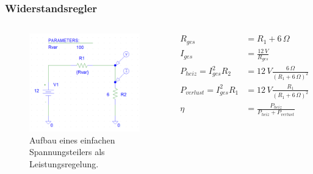 \documentclass{beamer}
\begin{document}
	\begin{frame}
		\frametitle{Widerstandsregler}
		\begin{columns}
			\begin{figure}[tbh]
				\centering
				\includegraphics[width=1\linewidth]{medien/V1-0.png}
				\caption[Erster Aufbau]{Aufbau eines einfachen Spannungsteilers als Leistungsregelung.}
			\end{figure}
			\begin{align*}
				R_{ges}&=R_1+6\,\Omega \\
				I_{ges}&=\frac{12\, V}{R_{ges}} \\
				P_{heiz}=I_{ges}^2R_2&=12\, V\frac{6\,\Omega}{\left( R_1 + 6\,\Omega\right) ^2} \\
				P_{verlust}=I_{ges}^2R_1&=12\, V\frac{R_1}{\left( R_1 + 6\,\Omega\right) ^2} \\
				\eta &= \frac{P_{heiz}}{P_{heiz}+P_{verlust}}
			\end{align*}
		\end{columns}
	\end{frame}
\end{document}
